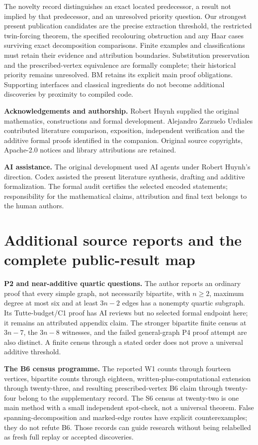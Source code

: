 \documentclass[smallextended]{svjour3}
\newcounter{none} %
\begin{document}
The novelty record distinguishes an exact located predecessor, a result
not implied by that predecessor, and an unresolved priority question.
Our strongest present publication candidates are the precise extraction
threshold, the restricted twin-forcing theorem, the specified
recolouring obstruction and any Haar cases surviving exact decomposition
comparisons. Finite examples and classifications must retain their
evidence and attribution boundaries. Substitution preservation and the
prescribed-vertex equivalence are formally complete; their historical
priority remains unresolved. BM retains its explicit main proof
obligations. Supporting interfaces and classical ingredients do not
become additional discoveries by proximity to compiled code.

\textbf{Acknowledgements and authorship.} Robert Huynh supplied the
original mathematics, constructions and formal development. Alejandro
Zarzuelo Urdiales contributed literature comparison, exposition,
independent verification and the additive formal proofs identified in
the companion. Original source copyrights, Apache-2.0 notices and
library attributions are retained.

\textbf{AI assistance.} The original development used AI agents under
Robert Huynh's direction. Codex assisted the present literature
synthesis, drafting and additive formalization. The formal audit
certifies the selected encoded statements; responsibility for the
mathematical claims, attribution and final text belongs to the human
authors.

\appendix
\section{Additional source reports and the complete
public-result
map}\label{appendix-a.-additional-source-reports-and-the-complete-public-result-map}

\textbf{P2 and near-additive quartic questions.} The author reports an
ordinary proof that every simple graph, not necessarily bipartite, with
\(n\ge2\), maximum degree at most six and at least \(3n-2\) edges has a
nonempty quartic subgraph. Its Tutte-budget/C1 proof has AI reviews but
no selected formal endpoint here; it remains an attributed appendix
claim. The stronger bipartite finite census at \(3n-7\), the \(3n-8\)
witnesses, and the failed general-graph P4 proof attempt are also
distinct. A finite census through a stated order does not prove a
universal additive threshold.

\textbf{The B6 census programme.} The reported W1 counts through
fourteen vertices, bipartite counts through eighteen,
written-plus-computational extension through twenty-three, and resulting
prescribed-vertex B6 claim through twenty-four belong to the
supplementary record. The S6 census at twenty-two is one main method
with a small independent spot-check, not a universal theorem. False
spanning-decomposition and marked-edge routes have explicit
counterexamples; they do not refute B6. Those records can guide research
without being relabelled as fresh full replay or accepted discoveries.
\end{document}
